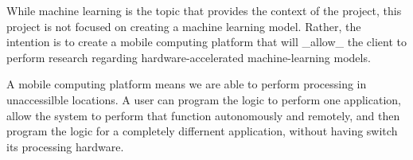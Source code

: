 
% 


While machine learning is the topic that provides the context of the project, this project is not focused on creating a machine learning model. Rather, the intention is to create a mobile computing platform that will \_allow\_ the client to perform research regarding hardware-accelerated machine-learning models.

A mobile computing platform means we are able to perform processing in unaccessilble locations. A user can program the logic to perform one application, allow the system to perform that function autonomously and remotely, and then program the logic for a completely differnent application, without having switch its processing hardware.





